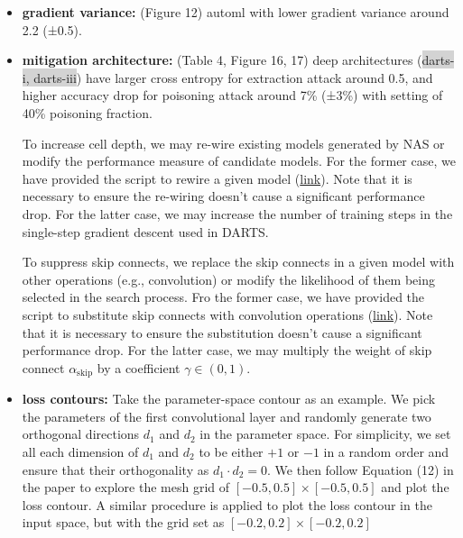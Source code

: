 \documentclass[letterpaper,twocolumn,10pt]{article}
\begin{document}
{{{{{{{\small
\begin{itemize}
    \item {\bf gradient variance: } (Figure 12) automl with lower gradient variance around 2.2 (±0.5).
    \item {\bf mitigation architecture: } (Table 4, Figure 16, 17) deep architectures (\colorbox{lightgray}{darts-i, darts-iii}) have larger cross entropy for extraction attack around 0.5, and higher accuracy drop for poisoning attack around 7\% (±3\%) with setting of 40\% poisoning fraction.
    
    To increase cell depth, we may re-wire existing models generated by NAS or modify the performance measure of candidate models. For the former case, we have provided the script to rewire a given model (\href{https://github.com/ain-soph/autovul/blob/main/projects/generate_mitigation.py}{link}). Note that it is necessary to ensure the re-wiring doesn't cause a significant performance drop. For the latter case, we may increase the number of training steps in the single-step gradient descent used in DARTS.  

    To suppress skip connects, we replace the skip connects in a given model with other operations (e.g., convolution) or modify the likelihood of them being selected in the search process. Fro the former case, we have provided the script to substitute skip connects with convolution operations (\href{https://github.com/ain-soph/autovul/blob/main/projects/generate_mitigation.py}{link}). Note that it is necessary to ensure the substitution doesn't cause a significant performance drop. For the latter case, we may multiply the weight of skip connect $\alpha_\mathrm{skip}$ by a coefficient $\gamma \in (0, 1)$.

    \item {\bf loss contours: } Take the parameter-space contour as an example. We pick the parameters of the first convolutional layer and randomly generate two orthogonal directions $d_1$ and $d_2$ in the parameter space. For simplicity, we set all each dimension of $d_1$ and $d_2$ to be either $+1$ or $-1$ in a random order and ensure that their orthogonality as $d_1 \cdot d_2 = 0$. We then follow Equation (12) in the paper to explore the mesh grid of $[-0.5, 0.5] \times [-0.5, 0.5]$ and plot the loss contour. A similar procedure is applied to plot the loss contour in the input space, but with the grid set as $[-0.2, 0.2] \times [-0.2, 0.2]$
\end{itemize}

}}}}}}}
\end{document}

